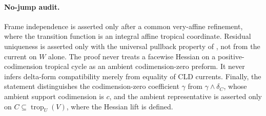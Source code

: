 \paragraph{No-jump audit.}
Frame independence is asserted only after a common very-affine refinement,
where the transition function is an integral affine tropical coordinate.
Residual uniqueness is asserted only with the universal pullback property
of \cite[Proposition~9.8]{GK17}, not from the current on \(W\) alone.
The proof never treats a facewise Hessian on a positive-codimension tropical
cycle as an ambient codimension-zero preform.  It never infers delta-form
compatibility merely from equality of CLD currents.  Finally, the statement
distinguishes the codimension-zero coefficient \(\gamma\) from
\(\gamma\wedge\delta_C\), whose ambient support codimension is \(c\), and
the ambient representative is asserted only on
\(C\subseteq\operatorname{trop}_U(V)\), where the Hessian lift is defined.
